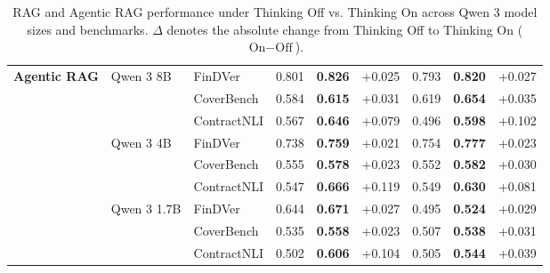 \documentclass[11pt]{article}
\begin{document}
\begin{table}[H]
\begin{tabular}{lllccc|ccc}
\multirow{9}{*}{\textbf{Agentic RAG}}
& \multirow{3}{*}{Qwen 3 8B}   & FinDVer     & 0.801 & \textbf{0.826} & +0.025 & 0.793 & \textbf{0.820} & +0.027 \\
& & CoverBench  & 0.584 & \textbf{0.615} & +0.031 & 0.619 & \textbf{0.654} & +0.035 \\
& & ContractNLI & 0.567 & \textbf{0.646} & +0.079 & 0.496 & \textbf{0.598} & +0.102 \\
\cmidrule(lr){2-9}
& \multirow{3}{*}{Qwen 3 4B}   & FinDVer     & 0.738 & \textbf{0.759} & +0.021 & 0.754 & \textbf{0.777} & +0.023 \\
& & CoverBench  & 0.555 & \textbf{0.578} & +0.023 & 0.552 & \textbf{0.582} & +0.030 \\
& & ContractNLI & 0.547 & \textbf{0.666} & +0.119 & 0.549 & \textbf{0.630} & +0.081 \\
\cmidrule(lr){2-9}
& \multirow{3}{*}{Qwen 3 1.7B} & FinDVer     & 0.644 & \textbf{0.671} & +0.027 & 0.495 & \textbf{0.524} & +0.029 \\
& & CoverBench  & 0.535 & \textbf{0.558} & +0.023 & 0.507 & \textbf{0.538} & +0.031 \\
& & ContractNLI & 0.502 & \textbf{0.606} & +0.104 & 0.505 & \textbf{0.544} & +0.039 \\

\bottomrule
\end{tabular}

\caption{RAG and Agentic RAG performance under Thinking Off vs. Thinking On across Qwen 3 model sizes and benchmarks. $\Delta$ denotes the absolute change from Thinking Off to Thinking On ($\text{On}-\text{Off}$).}
\label{tab:rag_agentic_rag_performance}
\end{table}
\end{document}

